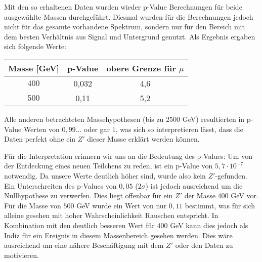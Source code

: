 Mit den so erhaltenen Daten wurden wieder p-Value Berechnungen für beide ausgewählte Massen durchgeführt.
Diesmal wurden für die Berechnungen jedoch nicht für das gesamte vorhandene Spektrum, sondern nur für den Bereich mit dem besten Verhältnis aus Signal und Untergrund genutzt.
Als Ergebnis ergaben sich folgende Werte:
\begin{center}
\begin{tabular}{c | c | c }
Masse [GeV] & p-Value & obere Grenze für $\mu$ \\
\hline
$400$ & 0,032 & 4,6 \\
$500$ & 0,11 & 5,2 \\
\end{tabular}
\end{center}
Alle anderen betrachteten Massehypothesen (bis zu $2500$ GeV) resultierten in p-Value Werten von $0,99...$ oder gar $1$, was sich so interpretieren lässt, dass die Daten perfekt ohne ein $Z'$ dieser Masse erklärt werden können.

Für die Interpretation erinnern wir uns an die Bedeutung des p-Values: Um von der Entdeckung eines neuen Teilchens zu reden, ist ein p-Value von $5,7 \cdot 10^{-7}$ notwendig.
Da unsere Werte deutlich höher sind, wurde also kein $Z'$-gefunden.
Ein Unterschreiten des p-Values von $0,05$ ($2 \sigma$) ist jedoch ausreichend um die Nullhypothese zu verwerfen.
Dies liegt offenbar für ein $Z'$ der Masse $400$ GeV vor.
Für die Masse von $500$ GeV wurde ein Wert von nur $0,11$ bestimmt, was für sich alleine gesehen mit hoher Wahrscheinlichkeit Rauschen entspricht.
In Kombination mit den deutlich besseren Wert für $400$ GeV kann dies jedoch als Indiz für ein Ereignis in diesem Massenbereich gesehen werden.
Dies wäre ausreichend um eine nähere Beschäftigung mit dem $Z'$ oder den Daten zu motivieren.

\clearpage